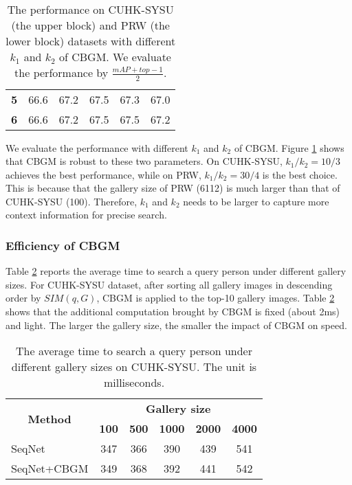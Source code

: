 \documentclass[letterpaper]{article} \usepackage{aaai21}  \usepackage{times}  \usepackage{helvet} \usepackage{courier}  \usepackage[hyphens]{url}  \usepackage{graphicx} \urlstyle{rm} \def\UrlFont{\rm}  \usepackage{natbib}  \usepackage{caption} \usepackage{multirow}
\begin{document}
\begin{table}[t]
{\begin{tabular}{|c|ccccc|}
            \textbf{5}                                       & 66.6                                    & 67.2        & 67.5          & 67.3        & 67.0        \\
            \textbf{6}                                       & 66.6                                    & 67.2        & 67.5          & 67.5        & 67.2        \\ \hline
        \end{tabular}
    }
    \caption{The performance on CUHK-SYSU (the upper block) and PRW (the lower block) datasets with different $k_1$ and $k_2$ of CBGM. We evaluate the performance by $\frac{mAP+top-1}{2}$.}
    \label{k1_k2}
\end{table}
We evaluate the performance with different $k_1$ and $k_2$ of CBGM. Figure \ref{k1_k2} shows that CBGM is robust to these two parameters. On CUHK-SYSU, $k_1/k_2=10/3$ achieves the best performance, while on PRW, $k_1/k_2=30/4$ is the best choice. This is because that the gallery size of PRW (6112) is much larger than that of CUHK-SYSU (100). Therefore, $k_1$ and $k_2$ needs to be larger to capture more context information for precise search.

\subsubsection{Efficiency of CBGM}
Table \ref{cbgm_speed} reports the average time to search a query person under different gallery sizes. For CUHK-SYSU dataset, after sorting all gallery images in descending order by $SIM(q, G)$, CBGM is applied to the top-10 gallery images. Table \ref{cbgm_speed} shows that the additional computation brought by CBGM is fixed (about 2ms) and light. The larger the gallery size, the smaller the impact of CBGM on speed.

\begin{table}[t]
    \centering
\resizebox{0.8\columnwidth}{!}
    {
        \begin{tabular}{|l|ccccc|}
            \hline
            \multicolumn{1}{|c|}{\multirow{2}{*}{\textbf{Method}}} & \multicolumn{5}{c|}{\textbf{Gallery size}}                                       \\ \cline{2-6} 
            \multicolumn{1}{|l|}{}                                 & \textbf{100}  & \textbf{500}  & \textbf{1000}   & \textbf{2000}  & \textbf{4000} \\ \hline \hline
            SeqNet                                                 & 347           & 366           & 390             & 439            & 541           \\
            SeqNet+CBGM                                            & 349           & 368           & 392             & 441            & 542           \\ \hline
        \end{tabular}
    }
    \caption{The average time to search a query person under different gallery sizes on CUHK-SYSU. The unit is milliseconds.}
    \label{cbgm_speed}
\end{table}
\end{document}

